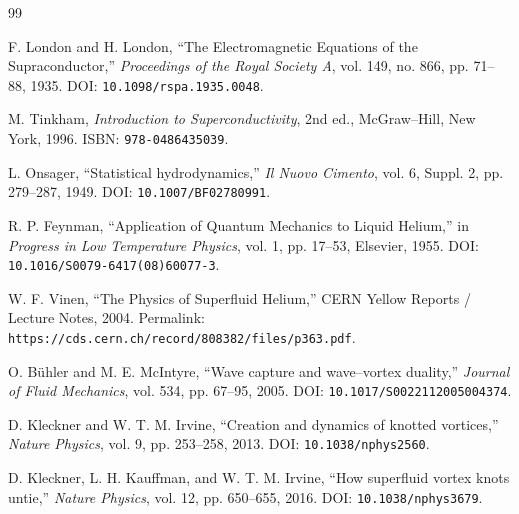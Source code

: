         \begin{thebibliography}{99}
            
            F. London and H. London,
            ``The Electromagnetic Equations of the Supraconductor,''
            \textit{Proceedings of the Royal Society A},
            vol. 149, no. 866, pp. 71--88, 1935.
            DOI: \texttt{10.1098/rspa.1935.0048}.
            
            M. Tinkham,
            \textit{Introduction to Superconductivity},
            2nd ed.,
            McGraw--Hill, New York, 1996.
            ISBN: \texttt{978-0486435039}.
            
            L. Onsager,
            ``Statistical hydrodynamics,''
            \textit{Il Nuovo Cimento},
            vol. 6, Suppl. 2, pp. 279--287, 1949.
            DOI: \texttt{10.1007/BF02780991}.
            
            R. P. Feynman,
            ``Application of Quantum Mechanics to Liquid Helium,''
            in \textit{Progress in Low Temperature Physics},
            vol. 1, pp. 17--53, Elsevier, 1955.
            DOI: \texttt{10.1016/S0079-6417(08)60077-3}.
            
            W. F. Vinen,
            ``The Physics of Superfluid Helium,''
            CERN Yellow Reports / Lecture Notes, 2004.
            Permalink: \texttt{https://cds.cern.ch/record/808382/files/p363.pdf}.
            
            O. B{\"u}hler and M. E. McIntyre,
            ``Wave capture and wave--vortex duality,''
            \textit{Journal of Fluid Mechanics},
            vol. 534, pp. 67--95, 2005.
            DOI: \texttt{10.1017/S0022112005004374}.
            
            D. Kleckner and W. T. M. Irvine,
            ``Creation and dynamics of knotted vortices,''
            \textit{Nature Physics},
            vol. 9, pp. 253--258, 2013.
            DOI: \texttt{10.1038/nphys2560}.
            
            D. Kleckner, L. H. Kauffman, and W. T. M. Irvine,
            ``How superfluid vortex knots untie,''
            \textit{Nature Physics},
            vol. 12, pp. 650--655, 2016.
            DOI: \texttt{10.1038/nphys3679}.
            

\end{thebibliography}
